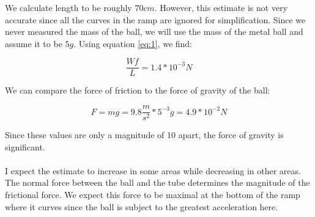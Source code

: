 \documentclass{article}
\begin{document}
We calculate length to be roughly $70 \si{cm}$. However, this estimate is not very accurate since all the curves in the ramp are ignored for simplification. Since we never measured the mass of the ball, we will use the mass of the metal ball and assume it to be $5 \si{g}$. Using equation \eqref{eq:1}, we find:

\begin{equation}
    \frac{Wf}{L} = 1.4 * 10^{-3} \si{N}
\end{equation}

We can compare the force of friction to the force of gravity of the ball:

\begin{equation}
F = mg = 9.8\frac{\si{m}}{\si{s}^{2}} * 5^{-3} \si{g} = 4.9 * 10^{-2} \si{N}
\end{equation}

Since these values are only a magnitude of 10 apart, the force of gravity is significant.
\\\\
I expect the estimate to increase in some areas while decreasing in other areas. The normal force between the ball and the tube determines the magnitude of the frictional force. We expect this force to be maximal at the bottom of the ramp where it curves since the ball is subject to the greatest acceleration here.


 

 

 
\end{document}
